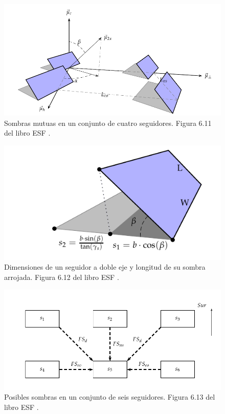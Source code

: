 \begin{figure}[htbp]
\centering
\includegraphics[height=0.2\textheight]{figuras/Sombras2X.pdf}
\caption{Sombras mutuas en un conjunto de cuatro seguidores. Figura 6.11 del libro ESF \cite{Perpinan2023}. \label{fig:sombras-doble}}
\end{figure}
\begin{figure}[htbp]
\centering
\includegraphics[height=0.2\textheight]{figuras/DimensionesSeguidorSombra.pdf}
\caption{Dimensiones de un seguidor a doble eje y longitud de su sombra arrojada. Figura 6.12 del libro ESF \cite{Perpinan2023}. \label{fig:dimensiones-sombras-doble}}
\end{figure}
\begin{figure}[htbp]
\centering
\includegraphics[height=0.2\textheight]{figuras/SixTrackerShadow.pdf}
\caption{Posibles sombras en un conjunto de seis seguidores. Figura 6.13 del libro ESF \cite{Perpinan2023}. \label{fig:conjunto-seis-seguidores}}
\end{figure}


